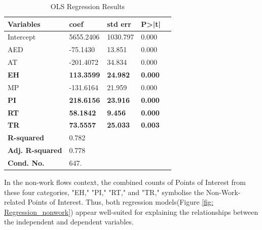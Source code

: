         \begin{table}[H]
        \centering
        \begin{tabular}{@{}lllll@{}}
        \toprule
        \textbf{Variables} & \textbf{coef} & \textbf{std err} & \textbf{P>|t|} \\ \midrule
        Intercept & 5655.2406 & 1030.797 & 0.000 \\
        AED & -75.1430 & 13.851 & 0.000 \\
        AT & -201.4072 & 34.834 & 0.000 \\
        \textcolor{customblue}{\textbf{EH}} & \textcolor{customblue}{\textbf{113.3599}} & \textcolor{customblue}{\textbf{24.982}} & \textcolor{customblue}{\textbf{0.000}} \\
        MP & -131.6164 & 21.959 & 0.000 \\
        \textcolor{customblue}{\textbf{PI}} & \textcolor{customblue}{\textbf{218.6156}} & \textcolor{customblue}{\textbf{23.916}} & \textcolor{customblue}{\textbf{0.000}} \\
        \textcolor{customblue}{\textbf{RT}} & \textcolor{customblue}{\textbf{58.1842}} & \textcolor{customblue}{\textbf{9.456}} & \textcolor{customblue}{\textbf{0.000}} \\
        \textcolor{customblue}{\textbf{TR}} & \textcolor{customblue}{\textbf{73.5557}} & \textcolor{customblue}{\textbf{25.033}} & \textcolor{customblue}{\textbf{0.003}} \\ \bottomrule
        \textbf{R-squared} & 0.782 \\
        \textbf{Adj. R-squared} & 0.778 \\
        \textbf{Cond. No.} & 647. \\ \bottomrule
        \hline
        \end{tabular}
        \caption{OLS Regression Results}
        \label{tab:ols-results-new-bold-color}
        \end{table}

        In the non-work flows context, the combined counts of Points of Interest from these four categories, "EH," "PI," "RT," and "TR," symbolise the Non-Work-related Points of Interest. Thus, both regression models(Figure \ref{fig: Regression_nonwork}) appear well-suited for explaining the relationships between the independent and dependent variables.


